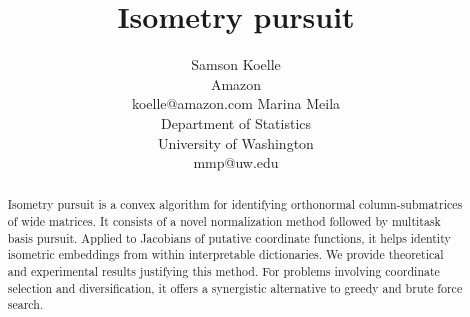\documentclass{article}
\title{Isometry pursuit}
\author{%
  Samson Koelle \\
  Amazon  \\
  koelle@amazon.com
  \And
  Marina Meila \\
  Department of Statistics\\
  University of Washington \\
  mmp@uw.edu
}
\begin{document}
\maketitle

\begin{abstract}
Isometry pursuit is a convex algorithm for identifying orthonormal column-submatrices of wide matrices.
It consists of a novel normalization method followed by multitask basis pursuit.
Applied to Jacobians of putative coordinate functions, it helps identity isometric embeddings from within interpretable dictionaries.
We provide theoretical and experimental results justifying this method.
For problems involving coordinate selection and diversification, it offers a synergistic alternative to greedy and brute force search.
\end{abstract}








\newpage



\newpage


\end{document}
